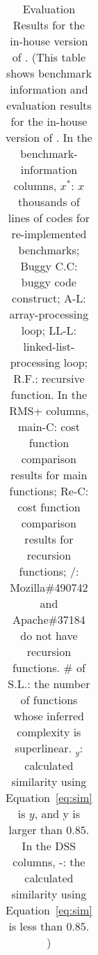 \begin{table}[h!]
{{\begin{tabular}{lccccccccccc}


    \bottomrule
   \end{tabular}
   }
   }
   \caption{Evaluation Results for the in-house version of \Tool.
  \footnotesize{(This table shows benchmark information and evaluation results for the in-house version of \Tool. In the benchmark-information columns,
   $x^*$: $x$ thousands of lines of codes for re-implemented benchmarks; 
   Buggy C.C: buggy code construct;
   A-L: array-processing loop; 
   LL-L: linked-list-processing loop;
   R.F.: recursive function.
   In the RMS+ columns,
   main-C: cost function comparison results for main functions;
   Re-C: cost function comparison results for recursion functions;
   /: Mozilla\#490742 and Apache\#37184 do not have recursion functions. 
   \# of S.L.: the number of functions whose inferred complexity is superlinear. 
   $_{y}$: calculated similarity using Equation~\ref{eq:sim} is $y$, and y is larger than $0.85$. 
    In the DSS columns, 
    -: the calculated similarity using Equation~\ref{eq:sim} is less than $0.85$.     
)}}
  \label{tab:benchmark_info}
\vspace{-0.4in}
\end{table}